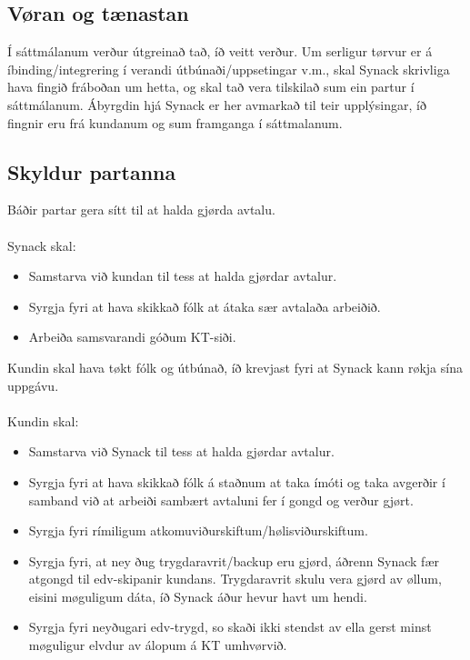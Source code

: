 \subsection{Vøran og tænastan}
Í sáttmálanum verður útgreinað tað, íð veitt verður. Um serligur tørvur er á íbinding/integrering í verandi útbúnaði/uppsetingar v.m., skal Synack skrivliga hava fingið fráboðan um hetta, og skal tað vera tilskilað sum ein partur í sáttmálanum. Ábyrgdin hjá Synack er her avmarkað til teir upplýsingar, íð fingnir eru frá kundanum og sum framganga í sáttmalanum.

\subsection{Skyldur partanna}
Báðir partar gera sítt til at halda gjørda avtalu. \\ \\
Synack skal:
\begin{itemize}
	\item Samstarva við kundan til tess at halda gjørdar avtalur.
	\item Syrgja fyri at hava skikkað fólk at átaka sær avtalaða arbeiðið.
	\item Arbeiða samsvarandi góðum KT-siði.
\end{itemize} \vspace{5mm}
Kundin skal hava tøkt fólk og útbúnað, íð krevjast fyri at Synack kann røkja sína uppgávu. \\ \\
Kundin skal:
\begin{itemize}
	\item Samstarva við Synack til tess at halda gjørdar avtalur.
	\item Syrgja fyri at hava skikkað fólk á staðnum at taka ímóti og taka avgerðir í samband við at arbeiði	sambært avtaluni fer í gongd og verður gjørt.
	\item Syrgja fyri rímiligum atkomuviðurskiftum/hølisviðurskiftum.
	\item Syrgja fyri, at ney ðug trygdaravrit/backup eru gjørd, áðrenn Synack fær atgongd til edv-skipanir kundans. Trygdaravrit skulu vera gjørd av øllum, eisini møguligum dáta, íð Synack áður hevur havt um hendi.
	\item Syrgja fyri neyðugari edv-trygd, so skaði ikki stendst av ella gerst minst møguligur elvdur av álopum á KT umhvørvið.
\end{itemize}

